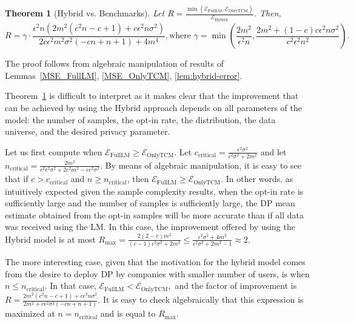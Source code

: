 \documentclass{article}
\theoremstyle{plain}
\newtheorem{thm}{Theorem}[section]
\begin{document}
\begin{thm}[Hybrid vs. Benchmarks]\label{thm:main}
Let $R = \frac{\min(\mathcal{E}_{\text{FullLM}}, \mathcal{E}_{\text{OnlyTCM}})}{\mathcal{E}_{\text{Hybrid}}}$.
Then, 
$$R = \gamma \cdot \frac{\epsilon^2 n \left(2 m^2 \left(c^2 n-c+1\right)+c \epsilon^2 n \sigma^2\right)}{2 c \epsilon^2 m^2 \sigma^2 (-c n+n+1)+4 m^4}, \text{where } \gamma = \min \left(\frac{2 m^2}{\epsilon^2 n},\frac{2 m^2+(1-c) c \epsilon^2 n \sigma^2}{c^2 \epsilon^2 n^2}\right).$$
\end{thm}
The proof follows from algebraic manipulation of results of Lemmas~\ref{MSE_FullLM}, \ref{MSE_OnlyTCM}, \ref{lem:hybrid-error}.

Theorem~\ref{thm:main} is difficult to interpret as it makes clear that the improvement that can be achieved by using the Hybrid approach depends on all parameters of the model: the number of samples, the opt-in rate, the distribution, the data universe, and the desired privacy parameter.

Let us first compute when $\mathcal{E}_{\text{FullLM}} \geq \mathcal{E}_{\text{OnlyTCM}}.$  Let $c_{\text{critical}} = \frac{\epsilon^2 \sigma^2}{\epsilon^2 \sigma^2+2 m^2}$ and let $n_{\text{critical}} = \frac{2 m^2}{c^2 \epsilon^2 \sigma^2+2 c^2 m^2-c \epsilon^2 \sigma^2}.$ By means of algebraic manipulation, it is easy to see that if $c>c_{\text{critical}}$ and $n \geq n_{\text{critical}}$, then $\mathcal{E}_{\text{FullLM}} \geq \mathcal{E}_{\text{OnlyTCM}}.$ %
In other words, as intuitively expected given the sample complexity results, when the opt-in rate is sufficiently large and the number of samples is sufficiently large, the DP mean estimate obtained from the opt-in samples will be more accurate than if all data was received using the LM. In this case, the improvement offered by using the Hybrid model is at most $R_{\text{max}} = \frac{2 (2-c) m^2}{(c-1) \epsilon^2 \sigma^2+2 m^2} \leq \frac{\epsilon^2\sigma^2+4m^2}{\epsilon^2\sigma^2+2m^2-1} \approx 2.$

The more interesting case, given that the motivation for the hybrid model comes from the desire to deploy DP by companies with smaller number of users, is when $n \leq n_{\text{critical}}.$ In that case, $\mathcal{E}_{\text{FullLM}} < \mathcal{E}_{\text{OnlyTCM}},$ and the factor of improvement is $R = \frac{2 m^2 \left(c^2 n-c+1\right)+c \epsilon^2 n \sigma^2 }{2 m^2 + c \epsilon^2 \sigma^2 (-c n+n+1)}.$ It is easy to check algebraically that this expression is maximized at $n = n_{\text{critical}}$ and is equal to $R_{\text{max}}.$
\end{document}

